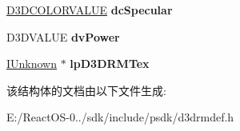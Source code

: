 \begin{DoxyCompactItemize}
\hyperlink{struct___d3_d_c_o_l_o_r_v_a_l_u_e}{D3\+D\+C\+O\+L\+O\+R\+V\+A\+L\+UE} {\bfseries dc\+Specular}
\item 
\mbox{\label{struct___d3_d_r_m_m_a_t_e_r_i_a_l_o_v_e_r_r_i_d_e_a2e9505b9ff65b94c86092c988315813a}} 
D3\+D\+V\+A\+L\+UE {\bfseries dv\+Power}
\item 
\mbox{\label{struct___d3_d_r_m_m_a_t_e_r_i_a_l_o_v_e_r_r_i_d_e_a20d449dfe50e2d7bd2ac13f65895b9ed}} 
\hyperlink{interface_i_unknown}{I\+Unknown} $\ast$ {\bfseries lp\+D3\+D\+R\+M\+Tex}
\end{DoxyCompactItemize}


该结构体的文档由以下文件生成\+:\begin{DoxyCompactItemize}
\item 
E\+:/\+React\+O\+S-\/0../sdk/include/psdk/d3drmdef.\+h\end{DoxyCompactItemize}
